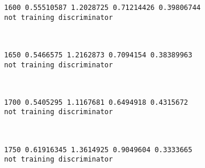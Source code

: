 \documentclass[11pt]{article}
\begin{document}
    \begin{Verbatim}[commandchars=\\\{\}]
1600 0.55510587 1.2028725 0.71214426 0.39806744
not training discriminator

    \end{Verbatim}

    \begin{center}
    \end{center}
    { \hspace*{\fill} \\}
    
    \begin{Verbatim}[commandchars=\\\{\}]
1650 0.5466575 1.2162873 0.7094154 0.38389963
not training discriminator

    \end{Verbatim}

    \begin{center}
    \end{center}
    { \hspace*{\fill} \\}
    
    \begin{Verbatim}[commandchars=\\\{\}]
1700 0.5405295 1.1167681 0.6494918 0.4315672
not training discriminator

    \end{Verbatim}

    \begin{center}
    \end{center}
    { \hspace*{\fill} \\}
    
    \begin{Verbatim}[commandchars=\\\{\}]
1750 0.61916345 1.3614925 0.9049604 0.3333665
not training discriminator

    \end{Verbatim}

    \begin{center}
    \end{center}
    { \hspace*{\fill} \\}
    
\end{document}
